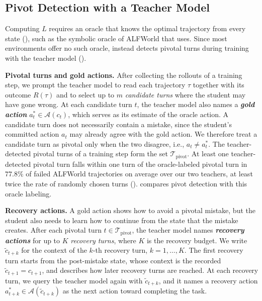 \documentclass[10pt, logo, onecolumn, copyright]{nv}
\begin{document}
\subsection{Pivot Detection with a Teacher Model}
\label{sec:pivotal_analysis}

Computing $L$ requires an oracle that knows the optimal trajectory from every state (), such as the symbolic oracle of ALFWorld that  uses. Since most environments offer no such oracle, \method{} instead detects pivotal turns during training with the teacher model ().

\textbf{Pivotal turns and gold actions.}
After collecting the rollouts of a training step, we prompt the teacher model to read each trajectory $\tau$ together with its outcome $R(\tau)$ and to select up to $m$ \emph{candidate turns} where the student may have gone wrong. At each candidate turn $t$, the teacher model also names a \emph{\textbf{gold action}} $a^{*}_t \in \mathcal{A}(c_t)$, which serves as its estimate of the oracle action. A candidate turn does not necessarily contain a mistake, since the student's committed action $a_t$ may already agree with the gold action. We therefore treat a candidate turn as pivotal only when the two disagree, i.e., $a_t \neq a^{*}_t$. The teacher-detected pivotal turns of a training step form the set $\mathcal{T}_\text{pivot}$. 
At least one teacher-detected pivotal turn falls within one turn of the oracle-labeled pivotal turn in $77.8\%$ of failed ALFWorld trajectories on average over our two teachers, at least twice the rate of randomly chosen turns ().  compares pivot detection with this oracle labeling.

\textbf{Recovery actions.}
A gold action shows how to avoid a pivotal mistake, but the student also needs to learn how to continue from the state that the mistake creates. After each pivotal turn $t \in \mathcal{T}_\text{pivot}$, the teacher model names \emph{\textbf{recovery actions}} for up to $K$ \emph{recovery turns}, where $K$ is the recovery budget. We write $\tilde{c}_{t+k}$ for the context of the $k$-th recovery turn, $k = 1, \dots, K$. The first recovery turn starts from the post-mistake state, whose context is the recorded $\tilde{c}_{t+1} = c_{t+1}$, and  describes how later recovery turns are reached. At each recovery turn, we query the teacher model again with $\tilde{c}_{t+k}$, and it names a recovery action $a^{*}_{t+k} \in \mathcal{A}(\tilde{c}_{t+k})$ as the next action toward completing the task.
\end{document}
